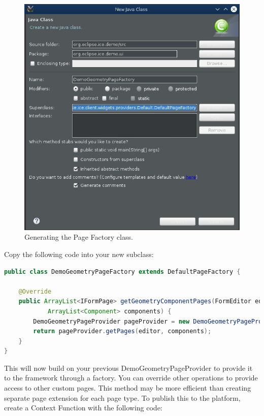 \begin{figure}[h]
\includegraphics[width=\textwidth]{pics/dynamicUI_geometryPageClass.png}
\caption{Generating the Page Factory class.}
\label{fig:icegeometryPageClass}
\end{figure}

Copy the following code into your new subclass:

\begin{lstlisting}[language=java]
public class DemoGeometryPageFactory extends DefaultPageFactory {

    @Override
    public ArrayList<IFormPage> getGeometryComponentPages(FormEditor editor,
            ArrayList<Component> components) {
        DemoGeometryPageProvider pageProvider = new DemoGeometryPageProvider();
        return pageProvider.getPages(editor, components);
    }
}
\end{lstlisting}

This will now build on your previous DemoGeometryPageProvider to provide it to
the framework through a factory. You can override other operations to provide
access to other custom pages. This method may be more efficient than creating
separate page extension for each page type. To publish this to the platform,
create a Context Function with the following code:

